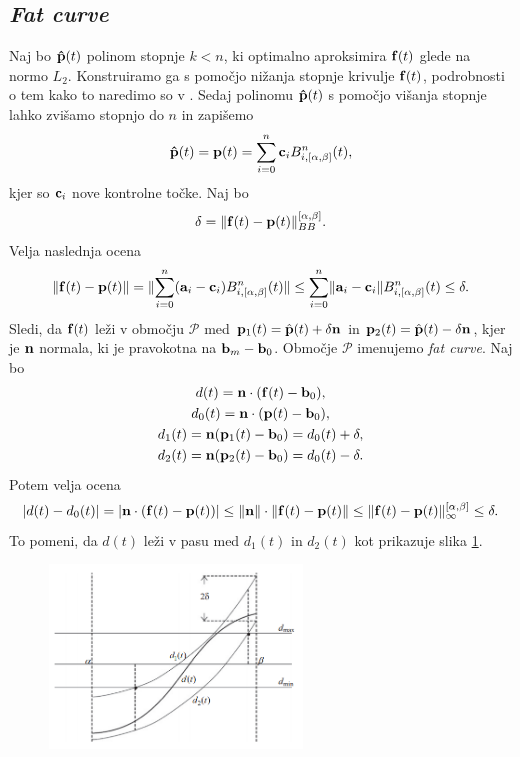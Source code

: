 
\subsection{\em Fat curve}
Naj bo ${\bf \hat{p}}(t)$ polinom stopnje $k < n$, ki optimalno aproksimira ${\bf f}(t)$ glede na normo $L_2$. Konstruiramo ga s pomočjo nižanja stopnje krivulje ${\bf f}(t)$, podrobnosti o tem kako to naredimo so v \cite{ls_sq}. Sedaj polinomu ${\bf \hat{p}}(t)$ s pomočjo višanja stopnje lahko zvišamo stopnjo do $n$ in zapišemo
$$
{\bf \hat{p}}(t) = {\bf p}(t) = \sum _{i=0}^n {\bf c}_iB_{i,[\alpha,\beta]}^n(t),
$$
kjer so ${\bf c}_i$ nove kontrolne točke. Naj bo 
\begin{equation}\label{def_delta}
\delta = \lVert {\bf f}(t) - {\bf p}(t) \rVert _{BB}^{[\alpha,\beta]}.
\end{equation}
Velja naslednja ocena
$$
\lVert {\bf f}(t) - {\bf p}(t) \rVert = \lVert \sum _{i=0}^n({\bf a}_i-{\bf c}_i)B_{i,[\alpha,\beta]}^n(t) \rVert
\leq \sum _{i=0}^n\lVert{\bf a}_i-{\bf c}_i\rVert B_{i,[\alpha,\beta]}^n(t) \leq \delta.
$$
Sledi, da ${\bf f}(t)$ leži v območju $\mathcal{P}$ med ${\bf p}_1(t) = \hat{{\bf p}}(t) + \delta {\bf n}$ in ${\bf p}_2(t) = \hat{{\bf p}}(t) - \delta {\bf n}$, kjer je ${\bf n}$ normala, ki je pravokotna na ${\bf b}_m - {\bf b}_0$. Območje $\mathcal{P}$ imenujemo {\em fat curve}. Naj bo
\begin{gather*}
d(t) = {\bf n}\cdot({\bf f}(t) - {\bf b}_0),\\
d_0(t)= {\bf n}\cdot ({\bf p}(t) - {\bf b}_0),\\
d_1(t) = {\bf n} ({\bf p}_1(t) - {\bf b}_0) = d_0(t) + \delta, \\
d_2(t) = {\bf n} ({\bf p}_2(t) - {\bf b}_0) = d_0(t) - \delta.
\end{gather*}
Potem velja ocena
$$
|d(t)-d_0(t)|=|{\bf n}\cdot({\bf f}(t)-{\bf p}(t))|\leq \lVert {\bf n}\rVert\cdot \lVert {\bf f}(t) - {\bf p}(t) \rVert \leq \lVert {\bf f}(t) - {\bf p}(t) \rVert _{\infty}^{[\alpha,\beta]} \leq \delta.
$$
To pomeni, da $d(t)$ leži v pasu med $d_1(t)$ in $d_2(t)$ kot prikazuje slika \ref{slika4}.
\begin{figure}[!h]
    \centering 
    \includegraphics[width=0.6\textwidth]{dist}
    \caption{}
  	\label{slika4}
\end{figure}